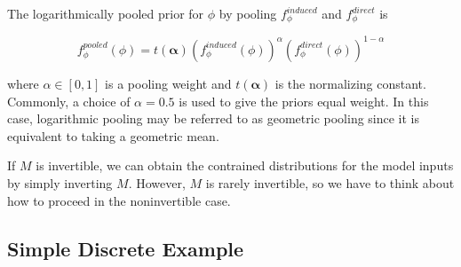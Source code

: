 \documentclass[12pt,twoside]{smiththesis}
\begin{document}
The logarithmically pooled prior for \(\phi\) by pooling \(f_\phi^{induced}\) and \(f_\phi^{direct}\) is

\[f_\phi^{pooled} (\phi) = t(\boldsymbol{\alpha}) (f_\phi^{induced}(\phi))^{\alpha} (f_\phi^{direct}(\phi))^{1-\alpha}\]

where \(\alpha \in [0,1]\) is a pooling weight and \(t(\boldsymbol{\alpha})\) is the normalizing constant. Commonly, a choice of \(\alpha = 0.5\) is used to give the priors equal weight. In this case, logarithmic pooling may be referred to as geometric pooling since it is equivalent to taking a geometric mean.

If \(M\) is invertible, we can obtain the contrained distributions for the model inputs by simply inverting \(M\). However, \(M\) is rarely invertible, so we have to think about how to proceed in the noninvertible case.

\hypertarget{simple-discrete-example}{%
\subsection{Simple Discrete Example}\label{simple-discrete-example}}
\end{document}
